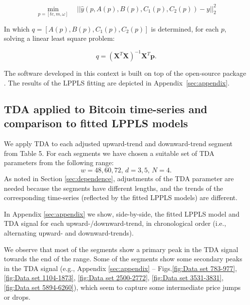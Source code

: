 \documentclass[11pt]{amsart}
\theoremstyle{definition}
\theoremstyle{remark}
\numberwithin{equation}{section}
\begin{document}
\begin{equation}
	\min_{p = [tc, m, \omega]} \quad   ||\hat{y}(p, A(p), B(p), C_1(p), C_2(p)) - y ||^2_2
\end{equation}

In which $q = [A(p), B(p), C_1(p), C_2(p)]$ is determined, for each $p$, solving a linear least square problem:

\begin{equation}
	q = ( \textbf{X}^T \textbf{X} )^{-1} \textbf{X}^T \textbf{p}.
\end{equation}

The software developed in this context is built on top of the open-source package \cite{Boulder-Investment-Technologies}. The results of the LPPLS fitting are depicted in  Appendix~\ref {sec:appendix}.


\subsection{TDA applied to Bitcoin time-series and comparison to fitted LPPLS models}
\label{sec:TDA_Bitcoin}

We apply TDA to each  adjusted upward-trend and downward-trend segment from Table 5.
For each segments we have chosen a suitable set of TDA  parameters from the following range:
\begin{equation}
w=48,60,72,\, d=3,5,\, N=4.
\label{eqn:TDA_parameters_2}
\end{equation}
As noted in Section \ref{sec:dependence}, adjustments of the TDA parameter are needed because the segments have different lengths,
and the trends  of the corresponding time-series (reflected by the fitted LPPLS models) are different.   %



In Appendix  \ref {sec:appendix} we show, side-by-side, the fitted LPPLS model and TDA signal for each upward-/downward-trend, in chronological order (i.e., alternating upward- and downward-trends).

We observe that most of the segments show a primary peak in the TDA signal towards the end of the range.  Some of the  segments  show some secondary peaks in the TDA signal (e.g.,  Appendix  \ref {sec:appendix} -- Figs.\ref{fig:Data set 783-977}, \ref{fig:Data set 1104-1873}, \ref{fig:Data set 2500-2772},  \ref{fig:Data set 3531-3831}, \ref{fig:Data set 5894-6260}), which seem  to capture some intermediate price jumps or drops.
\end{document}
